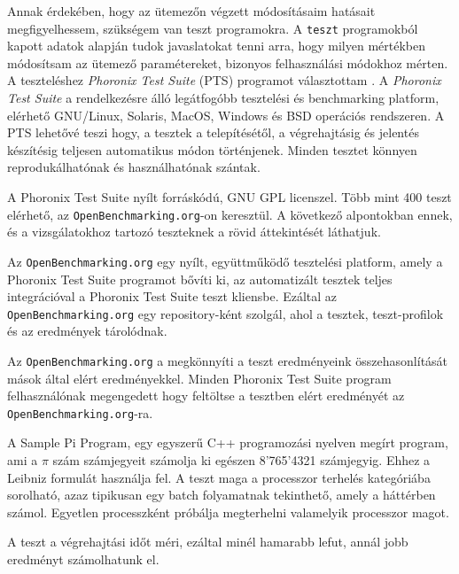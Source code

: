 

Annak érdekében, hogy az ütemezőn végzett módosításaim hatásait megfigyelhessem, szükségem van teszt programokra. A \texttt{teszt} programokból kapott adatok alapján tudok javaslatokat tenni arra, hogy milyen mértékben módosítsam az ütemező paramétereket, bizonyos felhasználási módokhoz mérten.
A teszteléshez \textit{Phoronix Test Suite} (PTS) programot választottam \cite{phoronix}.
A \textit{Phoronix Test Suite} a rendelkezésre álló legátfogóbb tesztelési és benchmarking platform, elérhető GNU/Linux, Solaris, MacOS, Windows és BSD operációs rendszeren.
A PTS lehetővé teszi hogy, a tesztek a telepítésétől, a végrehajtásig és jelentés készítésig teljesen automatikus módon történjenek.
Minden tesztet könnyen reprodukálhatónak és használhatónak szántak.

A Phoronix Test Suite nyílt forráskódú, GNU GPL licenszel.
Több mint 400 teszt elérhető, az \texttt{OpenBenchmarking.org}-on keresztül.
A következő alpontokban ennek, és a vizsgálatokhoz tartozó teszteknek a rövid áttekintését láthatjuk.


Az \texttt{OpenBenchmarking.org} egy nyílt, együttműködő tesztelési platform, amely a Phoronix Test Suite programot bővíti ki, az automatizált tesztek teljes integrációval a Phoronix Test Suite teszt kliensbe.
Ezáltal az \texttt{OpenBenchmarking.org} egy repository-ként szolgál, ahol a tesztek, teszt-profilok és az eredmények tárolódnak.

Az \texttt{OpenBenchmarking.org} a megkönnyíti a teszt eredményeink összehasonlítását mások által elért eredményekkel.
Minden Phoronix Test Suite program felhasználónak megengedett hogy feltöltse a tesztben elért eredményét az \texttt{OpenBenchmarking.org}-ra.


A  Sample Pi Program, egy egyszerű C++ programozási nyelven megírt program, ami a $\pi$ szám számjegyeit számolja ki egészen 8'765'4321 számjegyig. Ehhez a Leibniz formulát használja fel. A teszt maga a processzor terhelés kategóriába sorolható, azaz tipikusan egy batch folyamatnak tekinthető, amely a háttérben számol. Egyetlen processzként próbálja megterhelni valamelyik processzor magot. 

A teszt a végrehajtási időt méri, ezáltal minél hamarabb lefut, annál jobb eredményt számolhatunk el.

